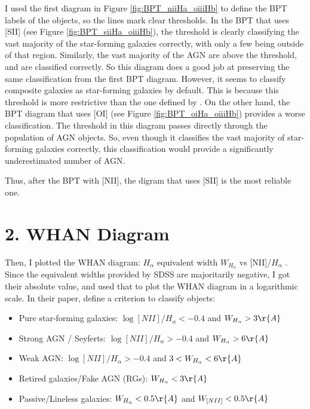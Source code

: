 \documentclass[letterpaper, oneside]{article}
\begin{document}
	I used the first diagram in Figure \ref{fig:BPT_niiHa_oiiiHb} to define the BPT labels of the objects, so the lines mark clear thresholds. In the BPT that uses [SII] (see Figure \ref{fig:BPT_siiHa_oiiiHb}), the threshold is clearly classifying the vast majority of the star-forming galaxies correctly, with only a few being outside of that region. Similarly, the vast majority of the AGN are above the threshold, and are classified correctly. So this diagram does a good job at preserving the same classification from the first BPT diagram. However, it seems to classify composite galaxies as star-forming galaxies by default. This is because this threshold is more restrictive than the one defined by \cite{Kauffmann_2003}. On the other hand, the BPT diagram that uses [OI] (see Figure \ref{fig:BPT_oiHa_oiiiHb}) provides a worse classification. The threshold in this diagram passes directly through the population of AGN objects. So, even though it classifies the vast majority of star-forming galaxies correctly, this classification would provide a significantly underestimated number of AGN.
	
	Thus, after the BPT with [NII], the digram that uses [SII] is the most reliable one.

	\section*{2. WHAN Diagram}
	
	Then, I plotted the WHAN diagram: $H_\alpha$ equivalent width $W_{H_\alpha}$ vs [NII]/$H_\alpha$ \cite{Cid_2011}. Since the equivalent widths provided by SDSS are majoritarily negative, I got their absolute value, and used that to plot the WHAN diagram in a logarithmic scale. In their paper, \cite{Cid_2011} define a criterion to classify objects:
	\begin{itemize}
		\item Pure star-forming galaxies: $\log{[NII] / H_\alpha} < -0.4$ and $W_{H_\alpha} > 3 \r{A}$
		
		\item Strong AGN / Seyferts: $\log{[NII] / H_\alpha} > -0.4$ and $W_{H_\alpha} > 6  \r{A}$
		
		\item Weak AGN: $\log{[NII] / H_\alpha} > -0.4$ and $3 < W_{H_\alpha} < 6  \r{A}$
		
		\item Retired galaxies/Fake AGN (RGs): $W_{H_\alpha} < 3 \r{A}$
		
		\item Passive/Lineless galaxies: $W_{H_\alpha} < 0.5 \r{A}$ and $W_{[NII]} < 0.5 \r{A}$
	\end{itemize}
\end{document}
